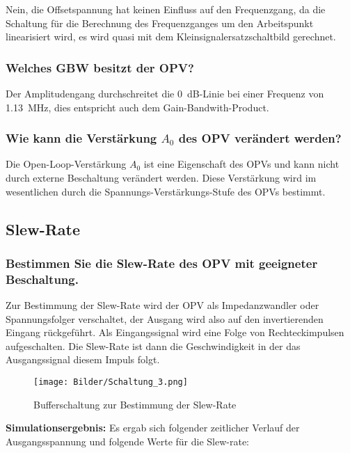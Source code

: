 Nein, die Offsetspannung hat keinen Einfluss auf den Frequenzgang, da die Schaltung für die Berechnung des Frequenzganges um den Arbeitspunkt linearisiert wird, es wird quasi mit dem Kleinsignalersatzschaltbild gerechnet.

\subsubsection{Welches GBW besitzt der OPV?}

Der Amplitudengang durchschreitet die \SI{0}{dB}-Linie bei einer Frequenz von \SI{1.13}{\mega \hertz}, dies entspricht auch dem Gain-Bandwith-Product.

\subsubsection{Wie kann die Verstärkung $A_0$ des OPV verändert werden?}

Die Open-Loop-Verstärkung $A_0$ ist eine Eigenschaft des OPVs und kann nicht durch externe Beschaltung verändert werden. Diese Verstärkung wird im wesentlichen durch die Spannungs-Verstärkungs-Stufe des OPVs bestimmt.

\subsection{Slew-Rate}

\subsubsection{Bestimmen Sie die Slew-Rate des OPV mit geeigneter Beschaltung.}

Zur Bestimmung der Slew-Rate wird der OPV als Impedanzwandler oder Spannungsfolger verschaltet, der Ausgang wird also auf den invertierenden Eingang rückgeführt. Als Eingangssignal wird eine Folge von Rechteckimpulsen aufgeschalten. Die Slew-Rate ist dann die Geschwindigkeit in der das Ausgangssignal diesem Impuls folgt.

\begin{figure}[H]
    \centering
    \texttt{[image: Bilder/Schaltung\_3.png]}
    \caption{Bufferschaltung zur Bestimmung der Slew-Rate}
    \label{fig:my_label}
\end{figure}

\textbf{Simulationsergebnis:} Es ergab sich folgender zeitlicher Verlauf der Ausgangsspannung und folgende Werte für die Slew-rate:

